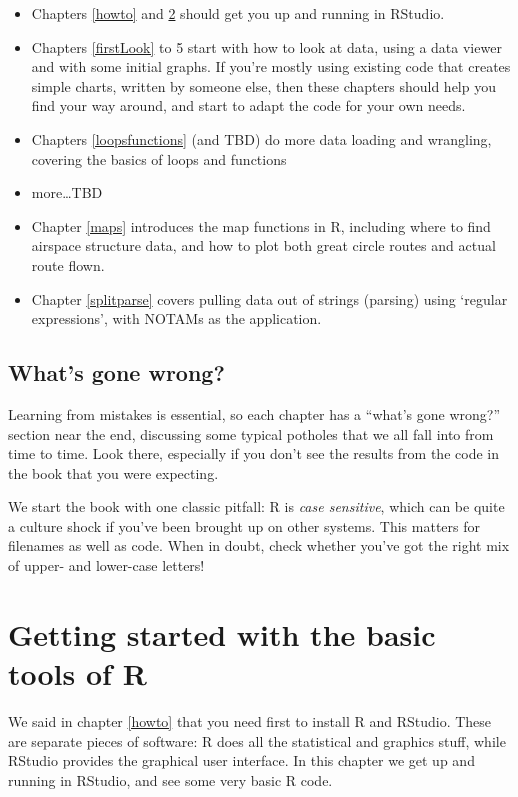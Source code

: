 \documentclass[
]{book}
\providecommand{\tightlist}{%
  \setlength{\itemsep}{0pt}\setlength{\parskip}{0pt}}
\begin{document}
\begin{itemize}
\tightlist
\item
  Chapters \ref{howto} and \ref{start} should get you up and running in RStudio.
\item
  Chapters \ref{firstLook} to 5 start with how to look at data, using a data viewer and with some initial graphs. If you're mostly using existing code that creates simple charts, written by someone else, then these chapters should help you find your way around, and start to adapt the code for your own needs.
\item
  Chapters \ref{loopsfunctions} (and TBD) do more data loading and wrangling, covering the basics of loops and functions
\item
  more\ldots TBD
\item
  Chapter \ref{maps} introduces the map functions in R, including where to find airspace structure data, and how to plot both great circle routes and actual route flown.
\item
  Chapter \ref{splitparse} covers pulling data out of strings (parsing) using `regular expressions', with NOTAMs as the application.
\end{itemize}

\hypertarget{whats-gone-wrong}{%
\section{What's gone wrong?}\label{whats-gone-wrong}}

Learning from mistakes is essential, so each chapter has a ``what's gone wrong?'' section near the end, discussing some typical potholes that we all fall into from time to time. Look there, especially if you don't see the results from the code in the book that you were expecting.

We start the book with one classic pitfall: R is \emph{case sensitive}, which can be quite a culture shock if you've been brought up on other systems. This matters for filenames as well as code. When in doubt, check whether you've got the right mix of upper- and lower-case letters!

\hypertarget{start}{%
\chapter{Getting started with the basic tools of R}\label{start}}

We said in chapter \ref{howto} that you need first to install R and RStudio. These are separate pieces of software: R does all the statistical and graphics stuff, while RStudio provides the graphical user interface. In this chapter we get up and running in RStudio, and see some very basic R code.
\end{document}

